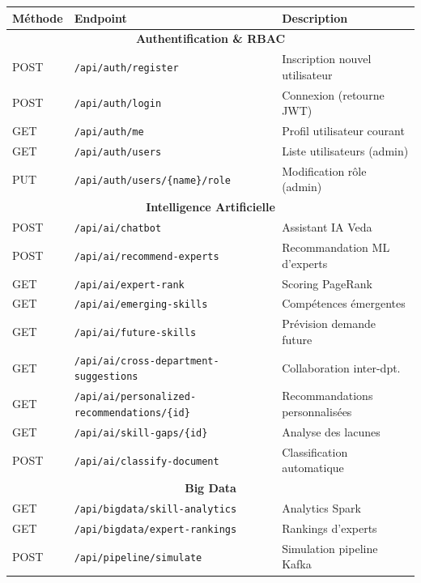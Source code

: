 \documentclass[12pt,a4paper]{article}
\begin{document}
\begin{center}
\renewcommand{\arraystretch}{1.3}
\begin{tabular}{|l|l|l|}
\hline
\rowcolor{bleu!15}
\textbf{Méthode} & \textbf{Endpoint} & \textbf{Description} \\
\hline
\multicolumn{3}{|c|}{\cellcolor{grisclair}\textbf{Authentification \& RBAC}} \\
\hline
POST & \texttt{/api/auth/register} & Inscription nouvel utilisateur \\
\hline
POST & \texttt{/api/auth/login} & Connexion (retourne JWT) \\
\hline
GET & \texttt{/api/auth/me} & Profil utilisateur courant \\
\hline
GET & \texttt{/api/auth/users} & Liste utilisateurs (admin) \\
\hline
PUT & \texttt{/api/auth/users/\{name\}/role} & Modification rôle (admin) \\
\hline
\multicolumn{3}{|c|}{\cellcolor{grisclair}\textbf{Intelligence Artificielle}} \\
\hline
POST & \texttt{/api/ai/chatbot} & Assistant IA Veda \\
\hline
POST & \texttt{/api/ai/recommend-experts} & Recommandation ML d'experts \\
\hline
GET & \texttt{/api/ai/expert-rank} & Scoring PageRank \\
\hline
GET & \texttt{/api/ai/emerging-skills} & Compétences émergentes \\
\hline
GET & \texttt{/api/ai/future-skills} & Prévision demande future \\
\hline
GET & \texttt{/api/ai/cross-department-suggestions} & Collaboration inter-dpt. \\
\hline
GET & \texttt{/api/ai/personalized-recommendations/\{id\}} & Recommandations personnalisées \\
\hline
GET & \texttt{/api/ai/skill-gaps/\{id\}} & Analyse des lacunes \\
\hline
POST & \texttt{/api/ai/classify-document} & Classification automatique \\
\hline
\multicolumn{3}{|c|}{\cellcolor{grisclair}\textbf{Big Data}} \\
\hline
GET & \texttt{/api/bigdata/skill-analytics} & Analytics Spark \\
\hline
GET & \texttt{/api/bigdata/expert-rankings} & Rankings d'experts \\
\hline
POST & \texttt{/api/pipeline/simulate} & Simulation pipeline Kafka \\

\end{tabular}
\end{center}
\end{document}
